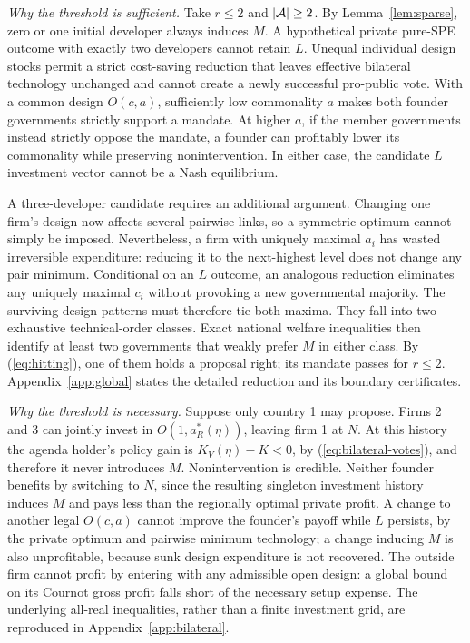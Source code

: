 \noindent\emph{Why the threshold is sufficient.}
Take \(r\le2\) and \(|\mathcal{A}|\ge2\).
By Lemma~\ref{lem:sparse}, zero or one initial developer always
induces \(M\). A hypothetical private pure-SPE outcome with exactly
two developers cannot retain \(L\). Unequal individual design
stocks permit a strict cost-saving reduction that leaves effective
bilateral technology unchanged and cannot create a newly successful
pro-public vote. With a common design \(O(c,a)\), sufficiently low
commonality \(a\) makes both founder governments strictly support
a mandate. At higher \(a\), if the member governments instead
strictly oppose the mandate, a founder can profitably lower its
commonality while preserving nonintervention. In either case,
the candidate \(L\) investment vector cannot be a Nash equilibrium.

A three-developer candidate requires an additional argument.
Changing one firm's design now affects several pairwise links,
so a symmetric optimum cannot simply be imposed.
Nevertheless, a firm with uniquely maximal \(a_i\) has wasted
irreversible expenditure: reducing it to the next-highest
level does not change any pair minimum. Conditional on an
\(L\) outcome, an analogous reduction eliminates any uniquely
maximal \(c_i\) without provoking a new governmental majority.
The surviving design patterns must therefore tie both maxima.
They fall into two exhaustive technical-order classes.
Exact national welfare inequalities then identify at least two
governments that weakly prefer \(M\) in either class.
By (\ref{eq:hitting}), one of them holds a proposal right;
its mandate passes for \(r\le2\). Appendix~\ref{app:global}
states the detailed reduction and its boundary certificates.

\noindent\emph{Why the threshold is necessary.}
Suppose only country 1 may propose. Firms 2 and 3 can jointly
invest in \(O(1,a_R^*(\eta))\), leaving firm 1 at \(N\).
At this history the agenda holder's policy gain is
\(K_V(\eta)-K<0\), by (\ref{eq:bilateral-votes}), and therefore
it never introduces \(M\). Nonintervention is credible.
Neither founder benefits by switching to \(N\), since the
resulting singleton investment history induces \(M\) and
pays less than the regionally optimal private profit.
A change to another legal \(O(c,a)\) cannot improve the
founder's payoff while \(L\) persists, by the private
optimum and pairwise minimum technology; a change
inducing \(M\) is also unprofitable, because sunk
design expenditure is not recovered. The outside
firm cannot profit by entering with any admissible
open design: a global bound on its Cournot gross
profit falls short of the necessary setup expense.
The underlying all-real inequalities, rather than
a finite investment grid, are reproduced in
Appendix~\ref{app:bilateral}.

